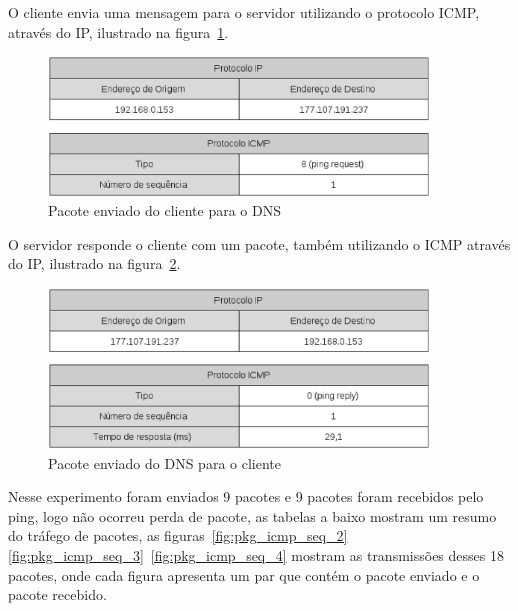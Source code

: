 O cliente envia uma mensagem para o servidor utilizando o protocolo ICMP,
através do IP, ilustrado na figura~\ref{fig:pkg_client_to_server}.

    \begin{figure}[h]
      \centering
      \includegraphics[width=0.9\textwidth]{figuras/pkg_client_to_server.eps}
      \caption{Pacote enviado do cliente para o DNS}
      \label{fig:pkg_client_to_server}
    \end{figure}

O servidor responde o cliente com um pacote, também utilizando o ICMP
através do IP, ilustrado na figura~\ref{fig:pkg_server_to_client}.

    \begin{figure}[h]
      \centering
      \includegraphics[width=0.9\textwidth]{figuras/pkg_server_to_client.eps}
      \caption{Pacote enviado do DNS para o cliente}
      \label{fig:pkg_server_to_client}
    \end{figure}

Nesse experimento foram enviados 9 pacotes e 9 pacotes foram recebidos
pelo ping, logo não ocorreu perda de pacote, as tabelas a baixo mostram
um resumo do tráfego de pacotes, as figuras~\ref{fig:pkg_icmp_seq_2}
\ref{fig:pkg_icmp_seq_3}~\ref{fig:pkg_icmp_seq_4} mostram as transmissões
desses 18 pacotes, onde cada figura apresenta um par que contém o pacote
enviado e o pacote recebido.

